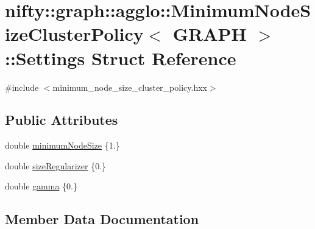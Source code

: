 \hypertarget{structnifty_1_1graph_1_1agglo_1_1MinimumNodeSizeClusterPolicy_1_1Settings}{}\section{nifty\+:\+:graph\+:\+:agglo\+:\+:Minimum\+Node\+Size\+Cluster\+Policy$<$ G\+R\+A\+P\+H $>$\+:\+:Settings Struct Reference}
\label{structnifty_1_1graph_1_1agglo_1_1MinimumNodeSizeClusterPolicy_1_1Settings}


{\ttfamily \#include $<$minimum\+\_\+node\+\_\+size\+\_\+cluster\+\_\+policy.\+hxx$>$}

\subsection*{Public Attributes}
\begin{DoxyCompactItemize}
\item 
double \hyperlink{structnifty_1_1graph_1_1agglo_1_1MinimumNodeSizeClusterPolicy_1_1Settings_ad25f32b2c05127471177047dadae1369}{minimum\+Node\+Size} \{1.\}
\item 
double \hyperlink{structnifty_1_1graph_1_1agglo_1_1MinimumNodeSizeClusterPolicy_1_1Settings_aba2de145c0fd50f2216b6e229e03d5ce}{size\+Regularizer} \{0.\}
\item 
double \hyperlink{structnifty_1_1graph_1_1agglo_1_1MinimumNodeSizeClusterPolicy_1_1Settings_a86db1e646b71730b2b1af39153746035}{gamma} \{0.\}
\end{DoxyCompactItemize}


\subsection{Member Data Documentation}
\hypertarget{structnifty_1_1graph_1_1agglo_1_1MinimumNodeSizeClusterPolicy_1_1Settings_a86db1e646b71730b2b1af39153746035}{}
